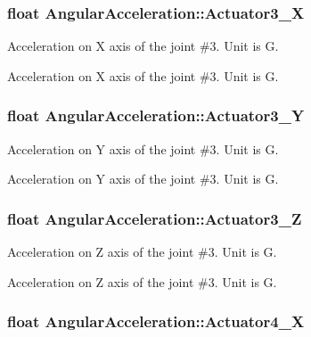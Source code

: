 \subsubsection[{\texorpdfstring{Actuator3\+\_\+X}{Actuator3_X}}]{\setlength{\rightskip}{0pt plus 5cm}float Angular\+Acceleration\+::\+Actuator3\+\_\+X}\hypertarget{struct_angular_acceleration_a687fb8bac7a0b529fbd07e7c5c17c281}{}\label{struct_angular_acceleration_a687fb8bac7a0b529fbd07e7c5c17c281}


Acceleration on X axis of the joint \#3. Unit is G. 

Acceleration on X axis of the joint \#3. Unit is G. 
\subsubsection[{\texorpdfstring{Actuator3\+\_\+Y}{Actuator3_Y}}]{\setlength{\rightskip}{0pt plus 5cm}float Angular\+Acceleration\+::\+Actuator3\+\_\+Y}\hypertarget{struct_angular_acceleration_a8b372df5c994266783918e9fc7260cb3}{}\label{struct_angular_acceleration_a8b372df5c994266783918e9fc7260cb3}


Acceleration on Y axis of the joint \#3. Unit is G. 

Acceleration on Y axis of the joint \#3. Unit is G. 
\subsubsection[{\texorpdfstring{Actuator3\+\_\+Z}{Actuator3_Z}}]{\setlength{\rightskip}{0pt plus 5cm}float Angular\+Acceleration\+::\+Actuator3\+\_\+Z}\hypertarget{struct_angular_acceleration_a178c35c220a0d0ecc8e0d228c10dfac0}{}\label{struct_angular_acceleration_a178c35c220a0d0ecc8e0d228c10dfac0}


Acceleration on Z axis of the joint \#3. Unit is G. 

Acceleration on Z axis of the joint \#3. Unit is G. 
\subsubsection[{\texorpdfstring{Actuator4\+\_\+X}{Actuator4_X}}]{\setlength{\rightskip}{0pt plus 5cm}float Angular\+Acceleration\+::\+Actuator4\+\_\+X}\hypertarget{struct_angular_acceleration_a5ac59b5d6354f56a574849b3058aff8a}{}\label{struct_angular_acceleration_a5ac59b5d6354f56a574849b3058aff8a}


